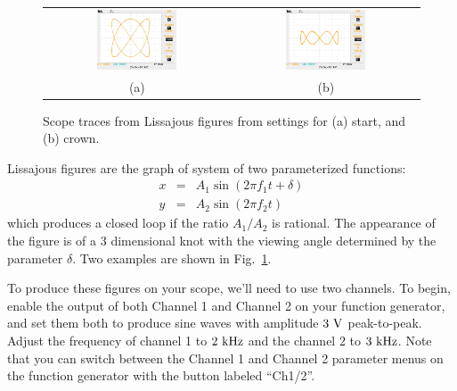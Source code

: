 \begin{figure}[htbp]
\begin{center}
\begin{tabular}{cc}
\includegraphics[width=0.45\textwidth]{figs/labs/lissajous/scope_lissajous.jpg} & 
\includegraphics[width=0.45\textwidth]{figs/labs/lissajous/scope_crown.jpg} \\
(a) & (b) \\
\end{tabular}
\caption{Scope traces from Lissajous figures from settings for (a) start, and (b) crown.}
\label{fig:tracelissajous}
\end{center}
\end{figure}
Lissajous figures are the graph of system of two parameterized functions:
\begin{eqnarray*}
x &=& A_1 \sin(2 \pi f_1 t + \delta) \\
y &=& A_2 \sin(2 \pi f_2 t) 
\end{eqnarray*}
which produces a closed loop if the ratio $A_1 / A_2$ is rational.  The appearance of the figure is of a 3 dimensional knot with the viewing angle determined by the parameter $\delta$.  Two examples are shown in Fig.~\ref{fig:tracelissajous}.

To produce these figures on your scope, we'll need to use two
channels.  To begin, enable the output of both Channel 1 and Channel 2
on your function generator, and set them both to produce sine waves
with amplitude $3~\rm V$ peak-to-peak.  Adjust the frequency of
channel 1 to $2~\rm kHz$ and the channel 2 to $3~\rm kHz$.  Note that
you can switch between the Channel 1 and Channel 2 parameter menus on the function generator
with the button labeled ``Ch1/2''.

